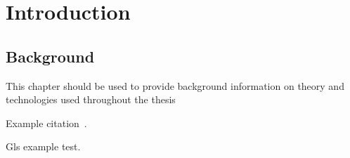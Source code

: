 \part{\label{part:intro}Introduction}
\chapter{\label{chp:background}Background}

This chapter should be used to provide background information on theory and technologies used throughout the thesis

Example citation~\cite{idc-prediction}.

Gls example \gls{test}.


\tocless